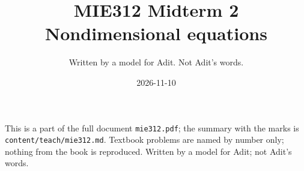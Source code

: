 
\title{MIE312 Midterm 2\\[0.3em]\large Nondimensional equations}
\author{Written by a model for Adit. Not Adit's words.}
\date{2026-11-10}

\maketitle
\begin{sloppypar}\noindent\small This is a part of the full document \texttt{mie312.pdf}; the summary with the marks is \texttt{content/teach/mie312.md}. Textbook problems are named by number only; nothing from the book is reproduced. Written by a model for Adit; not Adit's words.\normalsize\end{sloppypar}



